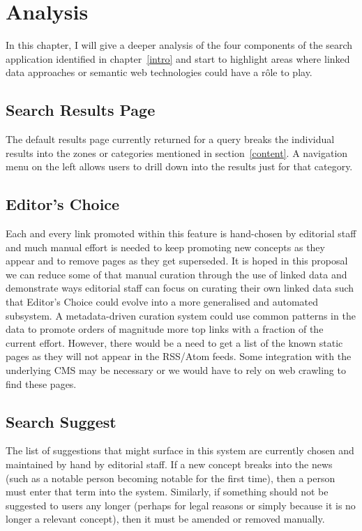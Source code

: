 \chapter{Analysis}
\label{analysis}

In this chapter, I will give a deeper analysis of the four
components of the search application identified in
chapter~\ref{intro} and start to highlight areas where linked data
approaches or semantic web technologies could have a r\^ole to play.



\section{Search Results Page}

The default results page currently returned for a query breaks the individual
results into the zones or categories mentioned in section~\ref{content}. A
navigation menu on the left allows users to drill down into the results just
for that category.

\section{Editor's Choice}

Each and every link promoted within this feature is hand-chosen by editorial
staff and much manual effort is needed to keep promoting new concepts
as they appear and to remove pages as they get superseded. It is hoped
in this proposal we can reduce some of that manual curation through the use
of linked data and demonstrate ways editorial staff can focus on curating
their own linked data such that Editor's Choice could evolve into a more
generalised and automated subsystem. A metadata-driven curation system
could use common patterns in the data to promote orders of magnitude more
top links with a fraction of the current effort.
However, there would be a need to get a list of the known static pages
as they will not appear in the RSS/Atom feeds. Some integration with the
underlying CMS may be necessary or we would have to rely on web crawling
to find these pages.

\section{Search Suggest}

The list of suggestions that might surface in this system are
currently chosen and maintained by hand by editorial staff. If a new
concept breaks into the news (such as a notable person becoming notable
for the first time), then a person must enter that term into the system.
Similarly, if something should not be suggested to users any longer
(perhaps for legal reasons or simply because it is no longer a relevant
concept), then it must be amended or removed manually.

